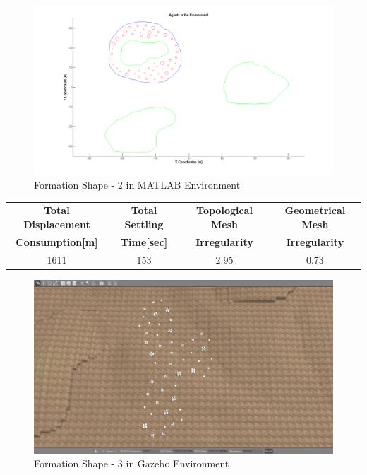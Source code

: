 \begin{figure}[H]
\caption{Formation Shape - 2 in MATLAB Environment}
\centerline{\includegraphics[scale = 0.40]{2}}
\end{figure} 
		 
\begin{center}
 \label{tab:title} 
\begin{tabular}{||c| c |c |c ||}
		 		
\hline
\textbf{Total Displacement }  & \textbf{Total Settling} & \textbf{Topological Mesh} & \textbf{Geometrical Mesh} \\ \textbf{Consumption[m]} & \textbf{Time[sec]}& \textbf{Irregularity} & \textbf{Irregularity} \\
\hline
1611 & 153 &  2.95& 0.73\\
\hline
\end{tabular}
\end{center}
		 
\begin{figure}[H]
\caption{Formation Shape - 3 in Gazebo Environment}
\centerline{\includegraphics[scale = 0.35]{3_Gazebo}}
\end{figure} 
				 
